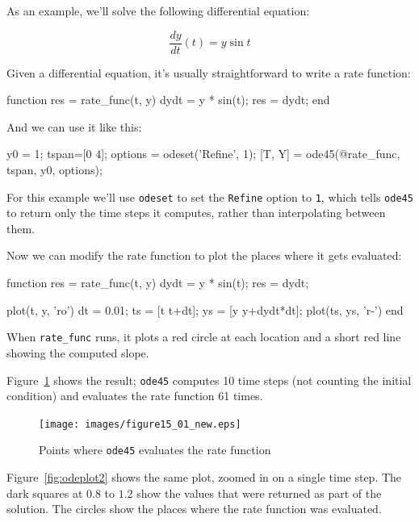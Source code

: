 As an example, we'll solve the following differential equation:

\[ \frac{dy}{dt}(t) = y \sin t \]

Given a differential equation, it's usually straightforward to write a rate function:

\begin{code}
function res = rate_func(t, y)
    dydt = y * sin(t);
    res = dydt;
end
\end{code}

And we can use it like this:

\begin{code}
    y0 = 1;
    tspan=[0 4];
    options = odeset('Refine', 1);
    [T, Y] = ode45(@rate_func, tspan, y0, options);
\end{code}

For this example we'll use \lstinline{odeset} to set the \lstinline{Refine} option to \lstinline{1}, which tells \lstinline{ode45} to return only the time steps it computes, rather than interpolating between them.


Now we can modify the rate function to plot the places where it gets evaluated:

\begin{code}
function res = rate_func(t, y)
    dydt = y * sin(t);
    res = dydt;

    plot(t, y, 'ro')
    dt = 0.01;
    ts = [t t+dt];
    ys = [y y+dydt*dt];
    plot(ts, ys, 'r-')
end
\end{code}

When \lstinline{rate_func} runs, it plots a red circle at each location and a short red line showing the computed slope.


Figure~\ref{fig:odeplot1} shows the result;  \lstinline{ode45} computes 10 time steps (not counting the initial condition) and evaluates the rate function 61 times.

\begin{figure}[h]
\centerline{\texttt{[image: images/figure15\_01\_new.eps]}}
\caption{Points where \lstinline{ode45} evaluates the rate function}
\label{fig:odeplot1}
\end{figure}

Figure~\ref{fig:odeplot2} shows the same plot, zoomed in on a single time step.
The dark squares at $0.8$ to $1.2$ show the values that were returned as part of the solution.
The circles show the places where the rate function was evaluated.

